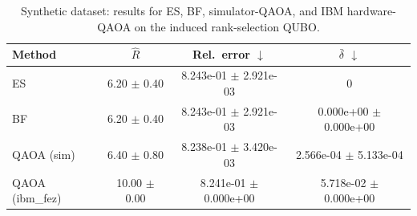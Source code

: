 \begin{table}[t]
\caption{Synthetic dataset: results for ES, BF, simulator-QAOA, and IBM hardware-QAOA on the induced rank-selection QUBO.}
\label{tab:synth_metrics}
\centering
\scriptsize
\setlength{\tabcolsep}{5pt}
\renewcommand{\arraystretch}{1.05}
\begin{tabular}{@{}lccc@{}}
\toprule
Method & \(\hat{R}\) & Rel.\ error \(\downarrow\) & \(\bar{\delta}\) \(\downarrow\) \\
\midrule
ES                               & 6.20 $\pm$ 0.40 & 8.243e-01 $\pm$ 2.921e-03 & 0 \\
BF                               & 6.20 $\pm$ 0.40 & 8.243e-01 $\pm$ 2.921e-03 & 0.000e+00 $\pm$ 0.000e+00 \\
QAOA (sim)                       & 6.40 $\pm$ 0.80 & 8.238e-01 $\pm$ 3.420e-03 & 2.566e-04 $\pm$ 5.133e-04 \\
QAOA (ibm\_fez)                 & 10.00 $\pm$ 0.00 & 8.241e-01 $\pm$ 0.000e+00 & 5.718e-02 $\pm$ 0.000e+00 \\
\bottomrule
\end{tabular}
\end{table}
